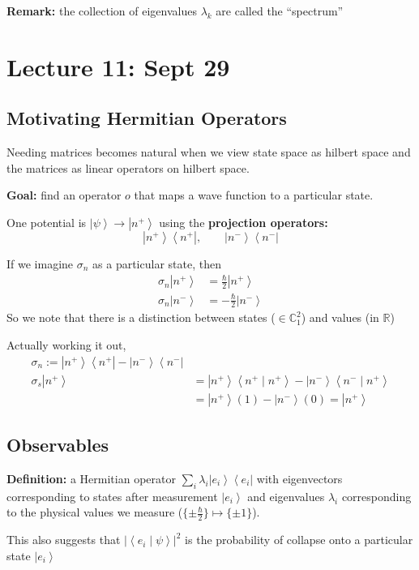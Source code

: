 \documentclass[12pt]{article}
\newcommand{\R}{\mathbb{R}}
\newcommand{\brak}[1]{\left\langle #1 \right\rangle}
\newcommand{\C}{\mathbb{C}}
\newcommand{\bra}[1]{\left\langle #1 \right\vert }
\newcommand{\ket}[1]{\left\vert #1 \right\rangle}
\begin{document}
\textbf{Remark:} the collection of eigenvalues $\lambda_k$ are called the ``spectrum''

\section*{Lecture 11: Sept 29}
\subsection*{Motivating Hermitian Operators}
Needing matrices becomes natural when we view state space as hilbert space and the matrices as linear operators on hilbert space. 

\textbf{Goal:} find an operator $o$ that maps a wave function to a particular state. 

One potential is $\ket \psi \to \ket{n^+}$ using the \textbf{projection operators:}
\[\ket{n^+}\bra{n^+}, \qquad \ket{n^-}\bra{n^-}\]

If we imagine $\sigma_n$ as a particular state, then 
\begin{align*}
    \sigma_n\ket{n^+} &= \frac{\hbar}{2}\ket{n^+}\\
    \sigma_n \ket{n^-} &= -\frac{\hbar}{2}\ket{n^-}
\end{align*}
So we note that there is a distinction between states ($\in \C_1^2$) and values (in $\R$)

Actually working it out, 
\begin{align*}
    \sigma_n := \ket{n^+}\bra{n^+} - \ket{n^-}\bra{n^-}\\
    \sigma_s \ket{n^+} &= \ket{n^+} \brak{n^+ \; | \; n^+} - \ket{n^-}\brak{n^- \; | \; n^+}\\
    &= \ket{n^+} (1) - \ket{n^-}(0) = \ket{n^+}
\end{align*}

\subsection*{Observables}
\textbf{Definition:} a Hermitian operator $\sum_i \lambda_i \ket{e_i} \bra{e_i}$ with eigenvectors corresponding to states after measurement $\ket{e_i}$ and eigenvalues $\lambda_i$ corresponding to the physical values we measure ($\{\pm \frac{\hbar}{2}\} \mapsto \{\pm 1\}$). 

This also suggests that $\big\vert \brak{e_i \; | \; \psi}
\big\vert^2$ is the probability of collapse onto a particular state $\ket{e_i}$ 
\end{document}
